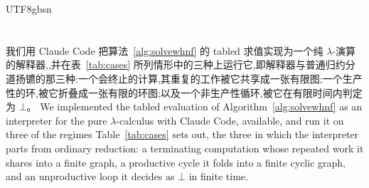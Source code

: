 \begin{CJK*}{UTF8}{gbsn}
  \section{}\label{sec:application}

  \ifTablambdaChinese
  我们用 Claude Code 把算法~\ref{alg:solvewhnf} 的 tabled 求值实现为一个纯 $\lambda$-演算的解释器,,并在表~\ref{tab:cases} 所列情形中的三种上运行它,即解释器与普通归约分道扬镳的那三种:一个会终止的计算,其重复的工作被它共享成一张有限图;一个生产性的环,被它折叠成一张有限的环图;以及一个非生产性循环,被它在有限时间内判定为 $\bot$。
  \else
  We implemented the tabled evaluation of Algorithm~\ref{alg:solvewhnf} as an interpreter for the pure $\lambda$-calculus with Claude Code, available, and run it on three of the regimes Table~\ref{tab:cases} sets out, the three in which the interpreter parts from ordinary reduction: a terminating computation whose repeated work it shares into a finite graph, a productive cycle it folds into a finite cyclic graph, and an unproductive loop it decides as $\bot$ in finite time.
  \fi

  \subsection{}\label{sec:application-sharing}


\end{CJK*}
